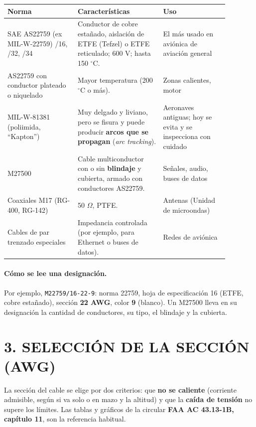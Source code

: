 \begin{center}
\small
\begin{tabular}{|p{0.28\linewidth}|p{0.34\linewidth}|p{0.26\linewidth}|}
\hline
\textbf{Norma} & \textbf{Características} & \textbf{Uso} \\ \hline
SAE AS22759 (ex MIL-W-22759) /16, /32, /34 & Conductor de cobre estañado, aislación de ETFE
(Tefzel) o ETFE reticulado; 600 V; hasta 150 $^\circ$C. & El más usado en aviónica de aviación
general \\ \hline
AS22759 con conductor plateado o niquelado & Mayor temperatura (200 $^\circ$C o más). & Zonas
calientes, motor \\ \hline
MIL-W-81381 (poliimida, ``Kapton'') & Muy delgado y liviano, pero se fisura y puede producir
\textbf{arcos que se propagan} (\textit{arc tracking}). & Aeronaves antiguas; hoy se evita y se
inspecciona con cuidado \\ \hline
M27500 & Cable multiconductor con o sin \textbf{blindaje} y cubierta, armado con conductores
AS22759. & Señales, audio, buses de datos \\ \hline
Coaxiales M17 (RG-400, RG-142) & 50 $\Omega$, PTFE. & Antenas (Unidad de microondas) \\ \hline
Cables de par trenzado especiales & Impedancia controlada (por ejemplo, para Ethernet o buses de
datos). & Redes de aviónica \\ \hline
\end{tabular}
\end{center}

\paragraph*{Cómo se lee una designación.} Por ejemplo, \texttt{M22759/16-22-9}: norma 22759,
hoja de especificación 16 (ETFE, cobre estañado), sección \textbf{22 AWG}, color \textbf{9}
(blanco). Un M27500 lleva en su designación la cantidad de conductores, su tipo, el blindaje y la
cubierta.

\section*{3. SELECCIÓN DE LA SECCIÓN (AWG)}

La sección del cable se elige por dos criterios: que \textbf{no se caliente} (corriente admisible,
según si va solo o en mazo y la altitud) y que la \textbf{caída de tensión} no supere los límites.
Las tablas y gráficos de la circular \textbf{FAA AC 43.13-1B, capítulo 11}, son la referencia
habitual.

